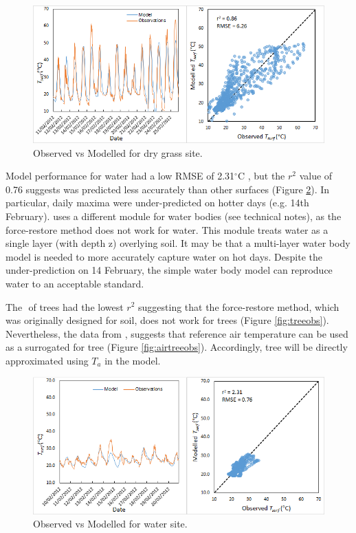 \documentclass[final,3p,times,authoryear]{elsarticle}
\newcommand{\degreeC}{\ensuremath{^\circ}C }
\begin{document}
 
\begin{figure}[!htbp]
\includegraphics[trim=0mm 0mm 0mm 0mm, clip,scale=0.68]{images/drygrassobs.png}
 \caption{Observed vs Modelled  for dry grass site.} \label{fig:drygrassobs}
\end{figure}



Model performance for water  had a low RMSE of 2.31\degreeC, but the $r^{2}$ value of 0.76 suggests  was predicted less accurately than other surfaces (Figure \ref{fig:waterobs}). In particular, daily maxima were under-predicted on hotter days (e.g. 14th February).  uses a different module for water bodies (see technical notes), as the force-restore method does not work for water. This module treats water as a single layer (with depth z) overlying soil. It may be that a multi-layer water body model is needed to more accurately capture water  on hot days.  Despite the under-prediction on 14 February, the simple water body model can reproduce water  to an acceptable standard. 

The ­ of trees had the lowest $r^{2}$ suggesting that the force-restore method, which was originally designed for soil, does not work for trees (Figure \ref{fig:treeobs}). Nevertheless, the data from \cite{Coutts2016b}, suggests that reference air temperature can be used as a surrogated for tree  (Figure \ref{fig:airtreeobs}). Accordingly, tree  will be directly approximated using $T_{a}$ in the model. 




\begin{figure}[!htbp]
\includegraphics[trim=0mm 0mm 0mm 0mm, clip,scale=0.88]{images/waterobs.png}
 \caption{Observed vs Modelled  for water site.} \label{fig:waterobs}
\end{figure}
\end{document}
